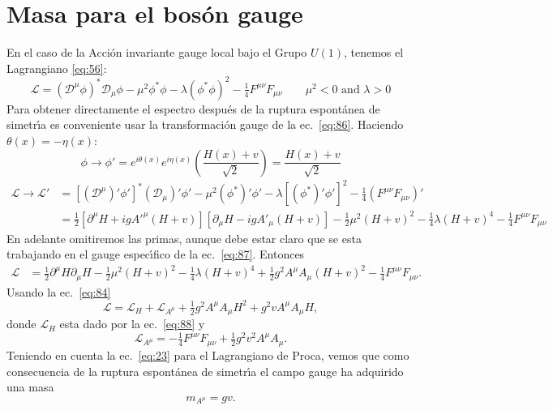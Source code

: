 \section{Masa para el bos\'on gauge}
\label{sec:masa-para-el-1}
En el caso de la Acci\'on invariante gauge local bajo el Grupo $U(1)$, tenemos el Lagrangiano \eqref{eq:56}:
\begin{equation}
  \label{eq:89}
  \mathcal{L}=\left(\mathcal{D}^\mu\phi\right)^*\mathcal{D}_\mu\phi-\mu^2\phi^*\phi-\lambda\left(\phi^*\phi\right)^2-\tfrac{1}{4}F^{\mu\nu}F_{\mu\nu}
  \qquad 
  \mu^2\lt 0\text{ and } \lambda\gt 0
\end{equation}
Para obtener directamente el espectro despu\'es de la ruptura espont\'anea de simetr\'\i a es conveniente usar la transformaci\'on gauge de la ec.~\eqref{eq:86}. Haciendo $\theta(x)=-\eta(x)$:
\begin{equation}
\label{eq:87}
   \phi\to\phi'=e^{i\theta(x)}e^{i\eta(x)}\left(\frac{H(x)+v}{\sqrt{2}}\right)=\frac{H(x)+v}{\sqrt{2}}
\end{equation}
\begin{align}
  \mathcal{L}\to\mathcal{L}' &=\left[\left(\mathcal{D}^\mu\right)'\phi'\right]^*\left(\mathcal{D}_\mu\right)'\phi'-\mu^2\left(\phi^*\right)'\phi'-\lambda\left[\left(\phi^*\right)'\phi'\right]^2-\tfrac{1}{4}\left(F^{\mu\nu}F_{\mu\nu}\right)'\nonumber\\
 &=\tfrac{1}{2}\left[\partial^\mu H+ig{A'}^\mu(H+v)\right]\left[\partial_\mu H-ig{A'}_\mu(H+v)\right]-\tfrac{1}{2}\mu^2(H+v)^2-\tfrac{1}{4}\lambda(H+v)^4-\tfrac{1}{4}F^{\mu\nu}F_{\mu\nu}
\end{align}
En adelante omitiremos las primas, aunque debe estar claro que se esta trabajando en el gauge espec\'\i fico de la ec.~\eqref{eq:87}. Entonces
\begin{align}
  \mathcal{L}&=\tfrac{1}{2}\partial^\mu H\partial_\mu H-\tfrac{1}{2}\mu^2(H+v)^2-
  \tfrac{1}{4}\lambda(H+v)^4+\tfrac{1}{2}g^2A^\mu A_\mu(H+v)^2
  -\tfrac{1}{4}F^{\mu\nu}F_{\mu\nu}.
\end{align}
Usando la ec.~\eqref{eq:84}
\begin{equation}
  \label{eq:94}
  \mathcal{L}=\mathcal{L}_H+\mathcal{L}_{A^\mu}+\tfrac{1}{2}g^2A^\mu A_\mu H^2+g^2vA^\mu A_\mu H,
\end{equation}
donde $\mathcal{L}_H$ esta dado por la ec.~\eqref{eq:88} y
\begin{equation}
  \mathcal{L}_{A^\mu}=-\tfrac{1}{4}F^{\mu\nu}F_{\mu\nu}+\tfrac{1}{2}g^2v^2A^\mu A_\mu.
\end{equation}
Teniendo en cuenta la ec.~\eqref{eq:23} para el Lagrangiano de Proca, vemos que como consecuencia de la ruptura espont\'anea de simetr\'\i a el campo gauge ha adquirido una masa
\begin{equation}
  m_{A^\mu}=gv.
\end{equation}

